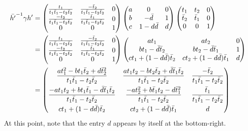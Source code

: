 \begin{align*}
  \bar{h'} ^{-1} \gamma h'
  &=
  \begin{pmatrix}
  \frac{t_1}{t_1 \bar t_1 - t_2 \bar t_2} & \frac{-\bar t_2}{t_1 \bar t_1 - t_2 \bar t_2} & 0 \\
  \frac{-t_2}{t_1 \bar t_1 - t_2 \bar t_2} & \frac{\bar t_1}{t_1 \bar t_1 - t_2 \bar t_2} & 0 \\
  0 & 0 & 1 \end{pmatrix}
  \begin{pmatrix}
    a & 0 & 0 \\
    b & - \bar d & 1 \\
    c & 1 - d \bar d & d
  \end{pmatrix}
  \begin{pmatrix}
  t_1 & t_2 & 0  \\
  \bar t_2 & \bar t_1 & 0 \\
  0 & 0 & 1
  \end{pmatrix} \\
  &=
  \begin{pmatrix}
  \frac{t_1}{t_1 \bar t_1 - t_2 \bar t_2} & \frac{-\bar t_2}{t_1 \bar t_1 - t_2 \bar t_2} & 0 \\
  \frac{-t_2}{t_1 \bar t_1 - t_2 \bar t_2} & \frac{\bar t_1}{t_1 \bar t_1 - t_2 \bar t_2} & 0 \\
  0 & 0 & 1 \end{pmatrix}
  \begin{pmatrix}
    at_1 & at_2 & 0 \\
    bt_1 - \bar d \bar t_2 & b t_2 - \bar d \bar t_1 & 1 \\
    ct_1 + (1-d\bar d)\bar t_2 & ct_2 + (1-d \bar d) \bar t_1 & d
  \end{pmatrix}
  \\
  &=
  \begin{pmatrix}
    \dfrac{at_1^2 - bt_1 \bar t_2 + d \bar t_2^2}{t_1 \bar t_1 - t_2 \bar t_2}
    & \dfrac{at_1t_2 - bt_2 \bar t_2 + \bar d \bar t_1 \bar t_2}{t_1 \bar t_1 - t_2 \bar t_2}
    & \dfrac{-\bar t_2}{t_1 \bar t_1 - t_2 \bar t_2} \\[2ex]
    \dfrac{-at_1t_2+bt_1\bar t_1-\bar d \bar t_1 \bar t_2}{t_1 \bar t_1 - t_2 \bar t_2}
    & \dfrac{-at_2^2+b\bar t_1 t_2-d\bar t_1^2}{t_1 \bar t_1 - t_2 \bar t_2}
    & \dfrac{\bar t_1}{t_1 \bar t_1 - t_2 \bar t_2} \\[2ex]
    ct_1 + (1-d\bar d)\bar t_2 & ct_2 + (1-d \bar d) \bar t_1 & d
  \end{pmatrix}
\end{align*}
At this point, note that the entry $d$ appears by itself at the bottom-right.

